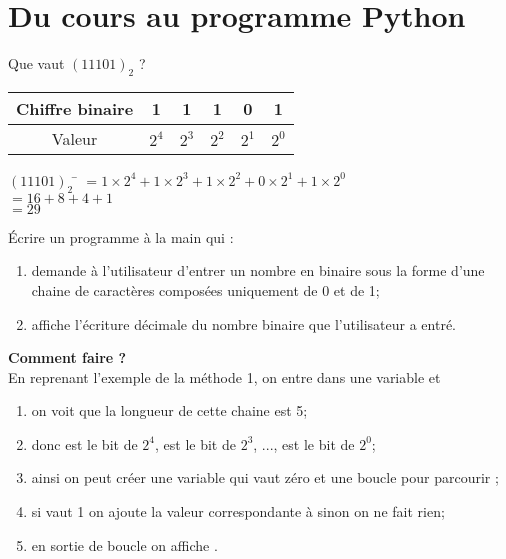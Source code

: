 \documentclass[a4paper,12pt,french]{book}
\begin{document}
\chapter*{Du cours au programme Python}



\begin{methode}
Que vaut $(11101)_2$ ?
\begin{center}
	\begin{tabular}{|c|c|c|c|c|c|}
		\hline 
		Chiffre binaire & 1 & 1 & 1 & 0 & 1 \\ 
		\hline 
		Valeur & $2^4$ & $2^3$ & $2^2$ & $2^1$ & $2^0$ \\ 
		\hline 
	\end{tabular}
\end{center}
\begin{tabbing}
		$(11101)_2$	\= 	$=1\times 2^4+1\times 2^3+1\times 2^2+0\times 2^1+1\times 2^0$	\\
			\>	$=16+8+4+1$	\\	
			\>	$=29$	
	\end{tabbing}\nopagebreak
\end{methode}
\begin{exercice}[]
	\'Ecrire un programme à la main qui :
\begin{enumerate}[--]
	\item 	demande à l'utilisateur d'entrer un nombre en binaire sous la forme d'une chaine de caractères composées uniquement de 0 et de 1;
	\item 	affiche l'écriture décimale du nombre binaire que l'utilisateur a entré.\\
\end{enumerate}

\textbf{Comment faire ?}\\

En reprenant l'exemple de la méthode 1, on entre  dans une variable  et
\begin{enumerate}[--]
	\item 	on voit que la longueur de cette chaine est 5;
	\item 	donc  est le bit de $2^4$,  est le bit de $2^3$, ...,  est le bit de $2^0$;
	\item 	ainsi on peut créer une variable  qui vaut zéro et une boucle  pour parcourir ;
	\item 	si  vaut 1 on ajoute la valeur correspondante à  sinon on ne fait rien;
	\item 	en sortie de boucle on affiche .
\end{enumerate}
\end{exercice}
\end{document}

